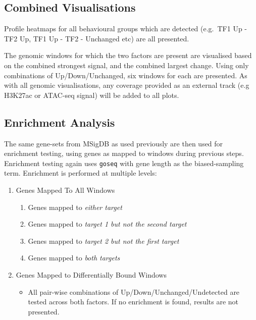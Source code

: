 \documentclass[
]{book}
\providecommand{\tightlist}{%
  \setlength{\itemsep}{0pt}\setlength{\parskip}{0pt}}
\begin{document}
\hypertarget{combined-visualisations}{%
\subsection*{Combined Visualisations}\label{combined-visualisations}}

Profile heatmaps for all behavioural groups which are detected (e.g.~TF1 Up - TF2 Up, TF1 Up - TF2 - Unchanged etc) are all presented.

The genomic windows for which the two factors are present are visualised based on the combined strongest signal, and the combined largest change.
Using only combinations of Up/Down/Unchanged, six windows for each are presented.
As with all genomic visualisations, any coverage provided as an external track (e.g H3K27ac or ATAC-seq signal) will be added to all plots.

\hypertarget{enrichment-analysis}{%
\subsection*{Enrichment Analysis}\label{enrichment-analysis}}

The same gene-sets from MSigDB\citep{msigdb} as used previously are then used for enrichment testing, using genes as mapped to windows during previous steps.
Enrichment testing again uses \texttt{goseq} with gene length as the biased-sampling term.
Enrichment is performed at multiple levels:

\begin{enumerate}
\def\labelenumi{\arabic{enumi}.}
\tightlist
\item
  Genes Mapped To All Windows

  \begin{enumerate}
  \def\labelenumii{\arabic{enumii}.}
  \tightlist
  \item
    Genes mapped to \emph{either target}
  \item
    Genes mapped to \emph{target 1 but not the second target}
  \item
    Genes mapped to \emph{target 2 but not the first target}
  \item
    Genes mapped to \emph{both targets}
  \end{enumerate}
\item
  Genes Mapped to Differentially Bound Windows

  \begin{itemize}
  \tightlist
  \item
    All pair-wise combinations of Up/Down/Unchanged/Undetected are tested across both factors. If no enrichment is found, results are not presented.
  \end{itemize}
\end{enumerate}
\end{document}
